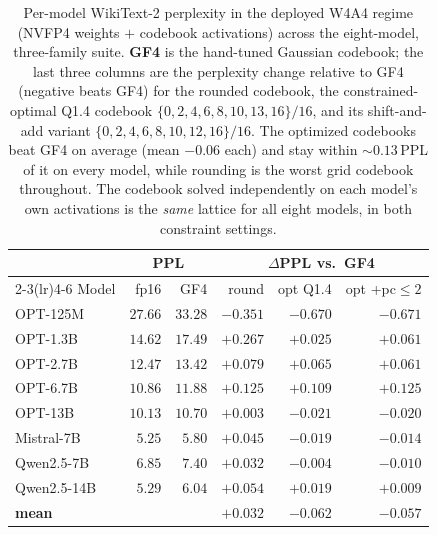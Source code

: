 \begin{table}[t]
  \centering
  \caption{Per-model WikiText-2 perplexity in the deployed W4A4 regime (NVFP4
  weights $+$ codebook activations) across the eight-model, three-family suite.
  \textbf{GF4} is the hand-tuned Gaussian codebook; the last three columns are the
  perplexity change relative to GF4 (negative beats GF4) for the rounded codebook,
  the constrained-optimal Q1.4 codebook $\{0,2,4,6,8,10,13,16\}/16$, and its
  shift-and-add variant $\{0,2,4,6,8,10,12,16\}/16$. The optimized codebooks beat
  GF4 on average (mean $-0.06$ each) and stay within $\sim\!0.13$\,PPL of it on
  every model, while rounding is the worst grid codebook throughout. The codebook
  solved independently on each model's own activations is the \emph{same} lattice
  for all eight models, in both constraint settings.}
  \label{tab:codebook-suite}
  \small
  \begin{tabular}{lrrrrr}
    \toprule
    & \multicolumn{2}{c}{PPL} & \multicolumn{3}{c}{$\Delta$PPL vs.\ GF4} \\
    \cmidrule(lr){2-3}\cmidrule(lr){4-6}
    Model & fp16 & GF4 & round & opt Q1.4 & opt +pc$\le2$ \\
    \midrule
    OPT-125M     & $27.66$ & $33.28$ & $-0.351$ & $-0.670$ & $-0.671$ \\
    OPT-1.3B     & $14.62$ & $17.49$ & $+0.267$ & $+0.025$ & $+0.061$ \\
    OPT-2.7B     & $12.47$ & $13.42$ & $+0.079$ & $+0.065$ & $+0.061$ \\
    OPT-6.7B     & $10.86$ & $11.88$ & $+0.125$ & $+0.109$ & $+0.125$ \\
    OPT-13B      & $10.13$ & $10.70$ & $+0.003$ & $-0.021$ & $-0.020$ \\
    Mistral-7B   & $5.25$  & $5.80$  & $+0.045$ & $-0.019$ & $-0.014$ \\
    Qwen2.5-7B   & $6.85$  & $7.40$  & $+0.032$ & $-0.004$ & $-0.010$ \\
    Qwen2.5-14B  & $5.29$  & $6.04$  & $+0.054$ & $+0.019$ & $+0.009$ \\
    \midrule
    \textbf{mean} &        &         & $+0.032$ & $-0.062$ & $-0.057$ \\
    \bottomrule
  \end{tabular}


\end{table}
